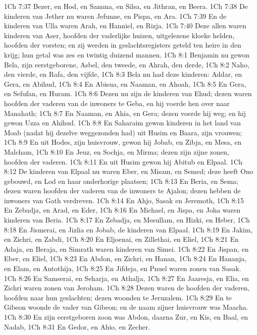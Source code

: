 1Ch 7:37  Bezer, en Hod, en Samma, en Silsa, en Jithran, en Beera.
1Ch 7:38  De kinderen van Jether nu waren Jefunne, en Pispa, en Ara.
1Ch 7:39  En de kinderen van Ulla waren Arah, en Hanniel, en Rizja.
1Ch 7:40  Deze allen waren kinderen van Aser, hoofden der vaderlijke huizen, uitgelezene kloeke helden, hoofden der vorsten; en zij werden in geslachtsregisters geteld ten heire in den krijg; hun getal was zes en twintig duizend mannen.
1Ch 8:1  Benjamin nu gewon Bela, zijn eerstgeborene, Asbel, den tweede, en Ahrah, den derde,
1Ch 8:2  Naho, den vierde, en Rafa, den vijfde,
1Ch 8:3  Bela nu had deze kinderen: Addar, en Gera, en Abihud,
1Ch 8:4  En Abisua, en Naaman, en Ahoah,
1Ch 8:5  En Gera, en Sefufan, en Huram.
1Ch 8:6  Dezen nu zijn de kinderen van Ehud; dezen waren hoofden der vaderen van de inwoners te Geba, en hij voerde hen over naar Manahath;
1Ch 8:7  En Naaman, en Ahia, en Gera; dezen voerde hij weg; en hij gewon Uzza en Ahihud.
1Ch 8:8  En Saharaim gewon kinderen in het land van Moab (nadat hij dezelve weggezonden had) uit Husim en Baara, zijn vrouwen;
1Ch 8:9  En uit Hodes, zijn huisvrouw, gewon hij Jobab, en Zibja, en Mesa, en Malcham,
1Ch 8:10  En Jeuz, en Sochja, en Mirma; dezen zijn zijne zonen, hoofden der vaderen.
1Ch 8:11  En uit Husim gewon hij Abitub en Elpaal.
1Ch 8:12  De kinderen van Elpaal nu waren Eber, en Misam, en Semed; deze heeft Ono gebouwd, en Lod en haar onderhorige plaatsen;
1Ch 8:13  En Beria, en Sema; dezen waren hoofden der vaderen van de inwoners te Ajalon; dezen hebben de inwoners van Gath verdreven.
1Ch 8:14  En Ahjo, Sasak en Jeremoth,
1Ch 8:15  En Zebadja, en Arad, en Eder,
1Ch 8:16  En Michael, en Jispa, en Joha waren kinderen van Beria.
1Ch 8:17  En Zebadja, en Mesullam, en Hizki, en Heber,
1Ch 8:18  En Jismerai, en Jizlia en Jobab, de kinderen van Elpaal.
1Ch 8:19  En Jakim, en Zichri, en Zabdi,
1Ch 8:20  En Eljoenai, en Zillethai, en Eliel,
1Ch 8:21  En Adaja, en Beraja, en Simrath waren kinderen van Simei.
1Ch 8:22  En Jispan, en Eber, en Eliel,
1Ch 8:23  En Abdon, en Zichri, en Hanan,
1Ch 8:24  En Hananja, en Elam, en Antothija,
1Ch 8:25  En Jifdeja, en Pnuel waren zonen van Sasak.
1Ch 8:26  En Samserai, en Seharja, en Athalja,
1Ch 8:27  En Jaaresja, en Elia, en Zichri waren zonen van Jeroham.
1Ch 8:28  Dezen waren de hoofden der vaderen, hoofden naar hun geslachten; dezen woonden te Jeruzalem.
1Ch 8:29  En te Gibeon woonde de vader van Gibeon; en de naam zijner huisvrouw was Maacha.
1Ch 8:30  En zijn eerstgeboren zoon was Abdon, daarna Zur, en Kis, en Baal, en Nadab,
1Ch 8:31  En Gedor, en Ahio, en Zecher.
